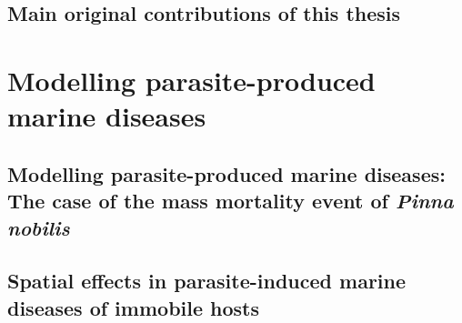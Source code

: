 \documentclass[
	10pt, %
	fleqn, %
	a4paper, %
]{LegrandOrangeBook}
\begin{document}
\chapterspaceabove{6.75cm}
\chapterspacebelow{7.25cm}

\chapter{Main original contributions of this thesis}
%

\part{Modelling parasite-produced marine diseases}

\chapterspaceabove{6.75cm}
\chapterspacebelow{7.25cm}

\chapter{Modelling parasite-produced marine diseases: The case of the mass
  mortality event of \textit{Pinna nobilis}}

\chapterspaceabove{6.75cm}
\chapterspacebelow{7.25cm}

\chapter{Spatial effects in parasite-induced marine diseases of immobile hosts}

\end{document}
